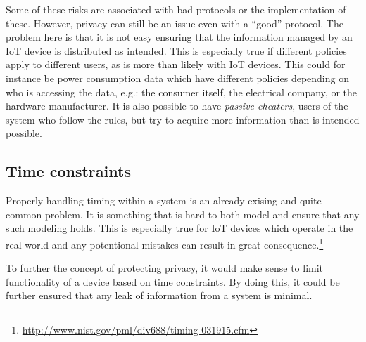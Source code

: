 Some of these risks are associated with bad protocols or the implementation of these.
However, privacy can still be an issue even with a ``good'' protocol.
The problem here is that it is not easy ensuring that the information managed by an IoT device is distributed as intended.
This is especially true if different policies apply to different users, as is more than likely with IoT devices.
This could for instance be power consumption data which have different policies depending on who is accessing the data, e.g.: the consumer itself, the electrical company, or the hardware manufacturer.
It is also possible to have \emph{passive cheaters}, users of the system who follow the rules, but try to acquire more information than is intended possible.

\subsection{Time constraints}
Properly handling timing within a system is an already-exising and quite common problem.
It is something that is hard to both model and ensure that any such modeling holds.
This is especially true for IoT devices which operate in the real world and any potentional mistakes can result in great consequence.\footnote{\url{http://www.nist.gov/pml/div688/timing-031915.cfm}}

To further the concept of protecting privacy, it would make sense to limit functionality of a device based on time constraints.
By doing this, it could be further ensured that any leak of information from a system is minimal.
